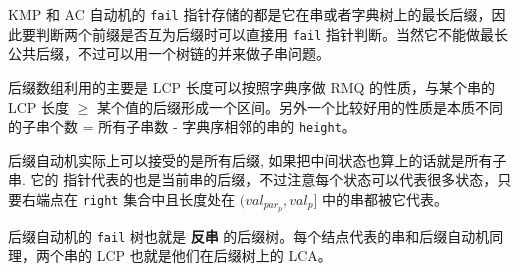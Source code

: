 KMP 和 AC 自动机的 \texttt{fail} 指针存储的都是它在串或者字典树上的最长后缀，因此要判断两个前缀是否互为后缀时可以直接用 \texttt{fail} 指针判断。当然它不能做最长公共后缀，不过可以用一个树链的并来做子串问题。

后缀数组利用的主要是 LCP 长度可以按照字典序做 RMQ 的性质，与某个串的 LCP 长度 $\ge$ 某个值的后缀形成一个区间。另外一个比较好用的性质是本质不同的子串个数 = 所有子串数 - 字典序相邻的串的 \texttt{height}。

后缀自动机实际上可以接受的是所有后缀, 如果把中间状态也算上的话就是所有子串. 它的  指针代表的也是当前串的后缀，不过注意每个状态可以代表很多状态，只要右端点在 \texttt{right} 集合中且长度处在 $(val_{par_p}, val_p]$ 中的串都被它代表。

后缀自动机的 \texttt{fail} 树也就是 \textbf{反串} 的后缀树。每个结点代表的串和后缀自动机同理，两个串的 LCP 也就是他们在后缀树上的 LCA。
